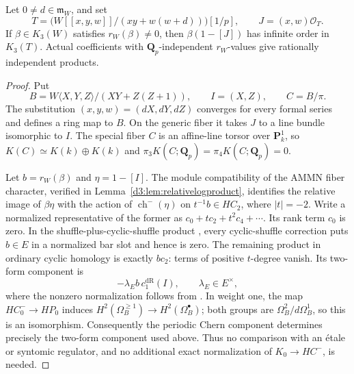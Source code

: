 \begin{proposition}\label{d3:prop:directtccoefficientcup}
Let $0\ne d\in\mathfrak m_W$, and set
\[
 T=\bigl(W[[x,y,w]]/(xy+w(w+d))\bigr)[1/p],\qquad J=(x,w)\mathcal O_T.
\]
If $\beta\in K_3(W)$ satisfies $r_W(\beta)\ne0$, then
$\beta(1-[J])$ has infinite order in $K_3(T)$. Actual coefficients
with $\mathbf Q_p$-independent $r_W$-values give rationally independent
products.
\end{proposition}
\begin{proof}
Put
\[
 B=W\langle X,Y,Z\rangle/(XY+Z(Z+1)),\qquad I=(X,Z),\qquad C=B/\pi.
\]
The substitution $(x,y,w)=(dX,dY,dZ)$ converges for every formal
series and defines a ring map to $B$. On the generic fiber it takes
$J$ to a line bundle isomorphic to $I$. The special fiber $C$ is an
affine-line torsor over $\mathbf P^1_k$, so
$K(C)\simeq K(k)\oplus K(k)$ and
$\pi_3K(C;\mathbf Q_p)=\pi_4K(C;\mathbf Q_p)=0$.

Let $b=r_W(\beta)$ and $\eta=1-[I]$. The module compatibility of the
AMMN fiber character, verified in Lemma~\ref{d3:lem:relativelogproduct},
identifies the relative image of $\beta\eta$ with the action of
$\operatorname{ch}^{-}(\eta)$ on $t^{-1}b\in HC_2$, where $|t|=-2$.
Write a normalized representative of the former as
$c_0+tc_2+t^2c_4+\cdots$. Its rank term $c_0$ is zero. In the
shuffle-plus-cyclic-shuffle product
\cite[Section~2, Remark~2.2]{BokstedtOttosen}, every cyclic-shuffle
correction puts $b\in E$ in a normalized bar slot and hence is zero.
The remaining product in ordinary cyclic homology is exactly $bc_2$:
terms of positive $t$-degree vanish. Its two-form component is
\[
 -\lambda_E b\,c_1^{\mathrm{dR}}(I),\qquad\lambda_E\in E^\times,
\]
where the nonzero normalization follows from
\cite[Proposition~4.12]{AMMN}. In weight one, the map
$HC^-_0\to HP_0$ induces
$H^2(\Omega_B^{\geq1})\to H^2(\Omega_B^\bullet)$; both groups
are $\Omega_B^2/d\Omega_B^1$, so this is an isomorphism.
Consequently the periodic Chern component determines precisely the
two-form component used above. Thus no comparison with an \'etale
or syntomic regulator, and no additional exact normalization of
$K_0\to HC^{-}$, is needed.


\end{proof}
